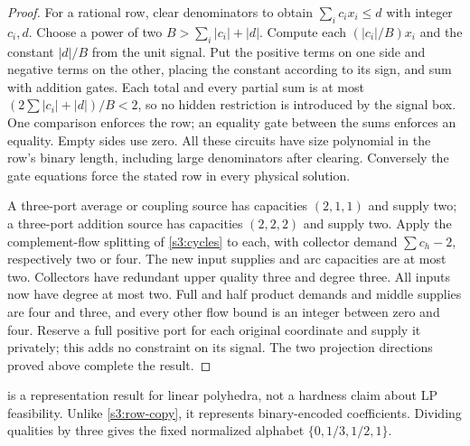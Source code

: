 \begin{proof}
For a rational row, clear denominators to obtain
$\sum_i c_ix_i\le d$ with integer $c_i,d$. Choose a power of two
$B>\sum_i|c_i|+|d|$. Compute each $(|c_i|/B)x_i$ and the constant
$|d|/B$ from the unit signal. Put the positive terms on one side and
negative terms on the other, placing the constant according to its sign,
and sum with addition gates. Each total and every partial sum is at
most $(2\sum|c_i|+|d|)/B<2$, so no hidden restriction is introduced
by the signal box. One comparison enforces the row; an equality gate
between the sums enforces an equality. Empty sides use zero. All these
circuits have size polynomial in the row's binary length, including
large denominators after clearing. Conversely the gate equations force
the stated row in every physical solution.

A three-port average or coupling source has capacities $(2,1,1)$ and
supply two; a three-port addition source has capacities $(2,2,2)$ and
supply two. Apply the complement-flow splitting of \cref{s3:cycles}
to each, with collector demand $\sum c_h-2$, respectively two or four.
The new input supplies and arc capacities are at most two. Collectors
have redundant upper quality three and degree three. All inputs now
have degree at most two. Full and half product demands and middle
supplies are four and three, and every other flow bound is an integer
between zero and four. Reserve a full positive port for each original
coordinate and supply it privately; this adds no constraint on its
signal. The two projection directions proved above complete the result.
\end{proof}

 is a representation result for linear
polyhedra, not a hardness claim about LP feasibility. Unlike
\cref{s3:row-copy}, it represents binary-encoded coefficients.
Dividing qualities by three gives the fixed normalized alphabet
$\{0,1/3,1/2,1\}$.

